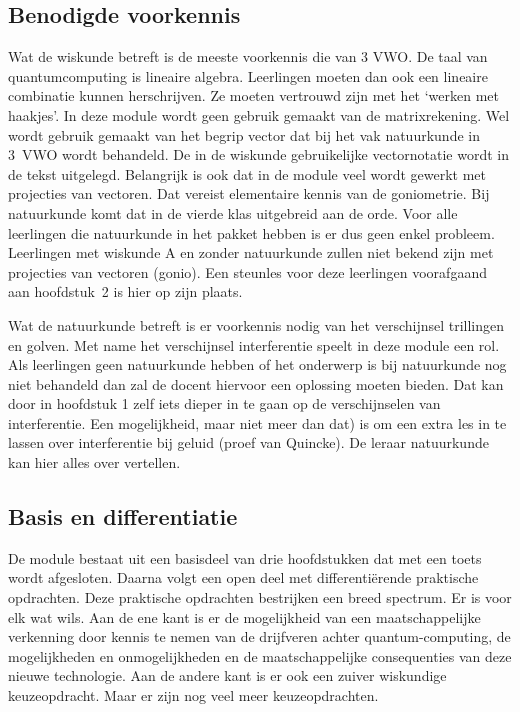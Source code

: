\documentclass[../../main.tex]{subfiles}
\begin{document}
\subsection*{Benodigde voorkennis}
Wat de wiskunde betreft is de meeste voorkennis die van 3 VWO.  De taal van quantumcomputing is lineaire algebra. Leerlingen moeten dan ook een lineaire combinatie kunnen herschrijven. Ze moeten vertrouwd zijn met het ‘werken met haakjes’. In deze module wordt geen gebruik gemaakt van de matrixrekening. Wel wordt gebruik gemaakt van het begrip vector dat bij het vak natuurkunde in 3~VWO wordt behandeld. De in de wiskunde gebruikelijke vectornotatie wordt in de tekst uitgelegd. 
Belangrijk is ook dat in de module veel wordt gewerkt met projecties van vectoren. Dat vereist elementaire kennis van de goniometrie. Bij natuurkunde komt dat in de vierde klas uitgebreid aan de orde. Voor alle leerlingen die natuurkunde in het pakket hebben is er dus geen enkel probleem. 
Leerlingen met wiskunde A en zonder natuurkunde zullen niet bekend zijn met projecties van vectoren (gonio). Een steunles voor deze leerlingen voorafgaand aan hoofdstuk~2 is hier op zijn plaats.

Wat de natuurkunde betreft is er voorkennis nodig van het verschijnsel trillingen en golven.  Met name het verschijnsel interferentie speelt in deze module een rol. Als leerlingen geen natuurkunde hebben of het onderwerp is bij natuurkunde nog niet behandeld dan zal de docent hiervoor een oplossing moeten bieden. Dat kan door in hoofdstuk 1 zelf iets dieper in te gaan op de verschijnselen van interferentie. Een mogelijkheid, maar niet meer dan dat) is om een extra les in te lassen over interferentie  bij geluid (proef van Quincke). De leraar natuurkunde kan hier alles over vertellen. 


\subsection*{Basis en differentiatie} De module bestaat uit een basisdeel van drie hoofdstukken dat met een toets wordt afgesloten. Daarna volgt een open deel met differentiërende praktische opdrachten. 
Deze praktische opdrachten bestrijken een breed spectrum. Er is voor elk wat wils.  Aan de ene kant is er de mogelijkheid van een maatschappelijke verkenning door kennis te nemen van de drijfveren achter quantum-computing, de mogelijkheden en onmogelijkheden en de maatschappelijke consequenties van deze nieuwe technologie. Aan de andere kant is er ook  een zuiver wiskundige keuzeopdracht. Maar er zijn nog veel meer keuzeopdrachten. 
\end{document}
